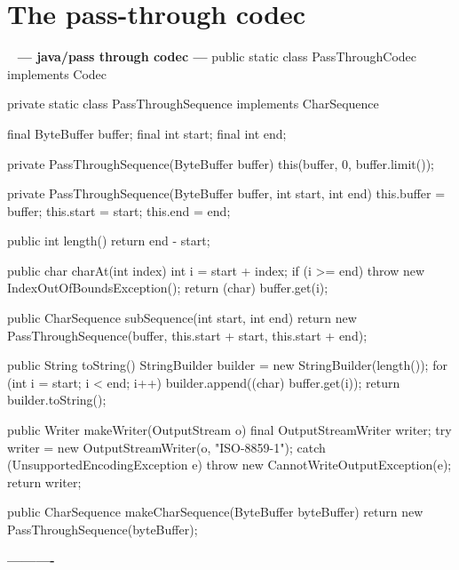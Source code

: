 \documentclass{book}
\newenvironment{chunk}[1]{%
{\ }\newline\noindent%
\hbox{\hskip 2.0cm}{\bf --- #1 ---}%
\verbatim}%                               say exactly what we see
{\endverbatim%
\par{}%
\noindent{}%
\hbox{\hskip 2.0cm}{\bf ----------}%
\par%
\normalsize\noindent}%
\begin{document}
\section{The pass-through codec}
\begin{chunk}{java/pass through codec}
public static class PassThroughCodec implements Codec {
    private static class PassThroughSequence implements CharSequence {
        final ByteBuffer buffer;
        final int start;
        final int end;

        private PassThroughSequence(ByteBuffer buffer) {
            this(buffer, 0, buffer.limit());
        }

        private PassThroughSequence(ByteBuffer buffer, int start, int end) {
            this.buffer = buffer;
            this.start = start;
            this.end = end;
        }

        public int length() {
            return end - start;
        }

        public char charAt(int index) {
            int i = start + index;
            if (i >= end) {
                throw new IndexOutOfBoundsException();
            }
            return (char) buffer.get(i);
        }

        public CharSequence subSequence(int start, int end) {
            return new PassThroughSequence(buffer, this.start + start, this.start + end);
        }

        public String toString() {
            StringBuilder builder = new StringBuilder(length());
            for (int i = start; i < end; i++) {
                builder.append((char) buffer.get(i));
            }
            return builder.toString();
        }
    }

    public Writer makeWriter(OutputStream o) {
        final OutputStreamWriter writer;
        try {
            writer = new OutputStreamWriter(o, "ISO-8859-1");
        } catch (UnsupportedEncodingException e) {
            throw new CannotWriteOutputException(e);
        }
        return writer;
    }

    public CharSequence makeCharSequence(ByteBuffer byteBuffer) {
        return new PassThroughSequence(byteBuffer);
    }
}
\end{chunk}
\end{document}
